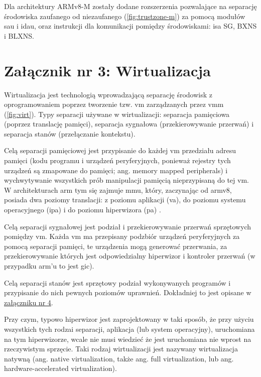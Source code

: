 \documentclass[../main]{subfiles}
\begin{document}
Dla architektury ARMv8-M zostały dodane rozszerzenia pozwalające na separację środowiska zaufanego od
niezaufanego (\cref{fig:trustzone-m}) za pomocą modułów \acrshort{sau} i \acrshort{idau},
oraz instrukcji dla komunikacji pomiędzy środowiskami: \acrshort{isa} SG, BXNS i BLXNS.
\cite{trustzonearmv8m}

\section*{Załącznik nr 3: Wirtualizacja}\label{sec:zalacznik-3}

Wirtualizacja jest technologią wprowadzającą separację środowisk z oprogramowaniem poprzez tworzenie
tzw. \acrshort{vm} zarządzanych przez \acrshort{vmm} (\cref{fig:virt}). Typy separacji używane w
wirtualizacji: separacja pamięciowa (poprzez translację pamięci), separacja sygnałowa (przekierowywanie
przerwań) i separacja stanów (przełączanie kontekstu).

Celą separacji pamięciowej jest przypisanie do każdej \acrshort{vm} przedziału adresu pamięci (kodu
programu i urządzeń peryferyjnych, ponieważ rejestry tych urządzeń są zmapowane do pamięci; ang. memory
mapped peripherals) i wychwytywanie wszystkich prób manipulacji pamięcią nieprzypisaną do tej
\acrshort{vm}. W architekturach \acrshort{arm} tym się zajmuje \acrshort{mmu}, który, zaczynając od
\acrshort{arm}v8, posiada dwa poziomy translacji: z poziomu aplikacji (\acrshort{va}), do poziomu
systemu operacyjnego (\acrshort{ipa}) i do poziomu hiperwizora (\acrshort{pa})
\cite{armv8amemtranslation}.

Celą separacji sygnałowej jest podział i przekierowywanie przerwań sprzętowych pomiędzy \acrshort{vm}.
Każda \acrshort{vm} ma przepisany podzbiór urządzeń peryferyjnych za pomocą separacji pamięci, te
urządzenia mogą generować przerwania, za przekierowywanie których jest odpowiedzialny hiperwizor i
kontroler przerwań (w przypadku \acrshort{arm}'u to jest \acrshort{gic}).

Celą separacji stanów jest sprzętowy podział wykonywanych programów i przypisanie do nich pewnych
poziomów uprawnień. Dokładniej to jest opisane w \hyperref[sec:zalacznik-4]{załączniku nr 4}.

Przy czym, typowo hiperwizor jest zaprojektowany w taki sposób, że przy użyciu wszystkich tych rodzai separacji, aplikacja (lub system operacyjny), uruchomiana na tym hiperwizorze, wcale nie musi wiedzieć że jest uruchomiana nie wprost na rzeczywistym sprzęcie. Taki rodzaj wirtualizacji jest nazywany wirtualizacja natywną (ang. native virtualization, także ang. full virtualization, lub ang. hardware-accelerated virtualization).
\end{document}
